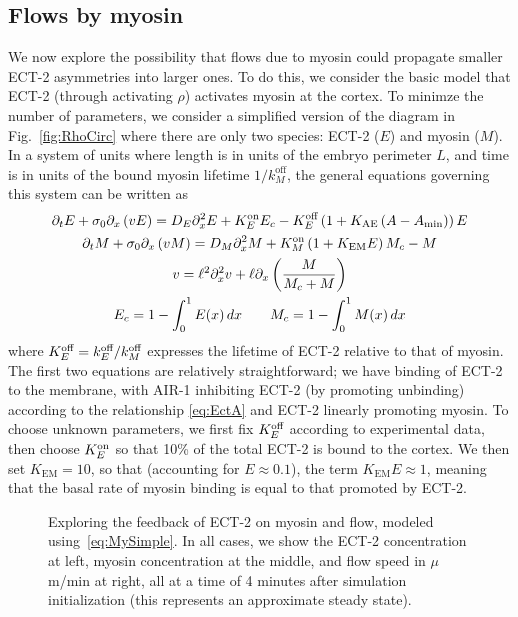 \documentclass[11pt]{article}
\begin{document}
\subsection{Flows by myosin}
We now explore the possibility that flows due to myosin could propagate smaller ECT-2 asymmetries into larger ones. To do this, we consider the basic model that ECT-2 (through activating $\rho$) activates myosin at the cortex. To minimze the number of parameters, we consider a simplified version of the diagram in Fig.\ \ref{fig:RhoCirc} where there are only two species: ECT-2 ($E$) and myosin ($M$). 
In a system of units where length is in units of the embryo perimeter $L$, and time is in units of the bound myosin lifetime $1/k^\text{off}_M$, the general equations governing this system can be written as
\begin{subequations}
\label{eq:MySimple}
\begin{gather}
\partial_t E + \sigma_0 \partial_x \left( v E\right) = D_E \partial_x^2 E +K^\text{on}_E E_c - K^\text{off}_E  \left(1+K_\text{AE} \left(A-A_\text{min}\right)\right)E \\
\partial_t M + \sigma_0 \partial_x \left( v M \right) = D_M \partial_x^2 M + K^\text{on}_M \left(1+K_\text{EM} E \right) M_c - M \\
\label{eq:veleqn}
v = \ell^2 \partial_x^2 v +\ell \partial_x \left(\frac{M}{M_c+M}\right) \\
E_c = 1-\int_0^1 E(x) \, dx \qquad M_c = 1-\int_0^1 M(x) \, dx
\end{gather} 
\end{subequations}
where $K^\text{off}_E=k^\text{off}_E/k^\text{off}_M$ expresses the lifetime of ECT-2 relative to that of myosin. The first two equations are relatively straightforward; we have binding of ECT-2 to the membrane, with AIR-1 inhibiting ECT-2 (by promoting unbinding) according to the relationship \eqref{eq:EctA} and ECT-2 linearly promoting myosin. To choose unknown parameters, we first fix $K^\text{off}_E$ according to experimental data, then choose $K^\text{on}_E$ so that 10\% of the total ECT-2 is bound to the cortex. We then set $K_\text{EM}=10$, so that (accounting for $E \approx 0.1$), the term $K_\text{EM}E \approx 1$, meaning that the basal rate of myosin binding is equal to that promoted by ECT-2. 

\begin{figure}
\centering
{}
\caption{\label{fig:TryFlows} Exploring the feedback of ECT-2 on myosin and flow, modeled using\ \eqref{eq:MySimple}. In all cases, we show the ECT-2 concentration at left, myosin concentration at the middle, and flow speed in $\mu$m/min at right, all at a time of 4 minutes after simulation initialization (this represents an approximate steady state).}
\end{figure}
\end{document}
